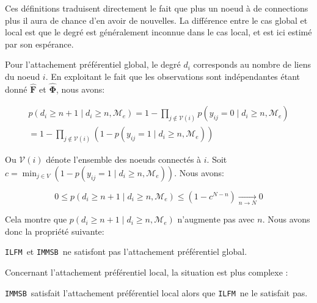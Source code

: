 \documentclass[french]{hermes-journal}
\newcommand{\ilfm}{\texttt{ILFM}}
\newcommand{\immsb}{\texttt{IMMSB}}
\newcommand{\pr}{p}
\newcommand{\mat}[1]{\bm{#1}}
\begin{document}
Ces définitions traduisent directement le fait que plus un noeud à de connections plus il aura de chance d'en avoir de nouvelles. La différence entre le cas global et local est que le degré est généralement inconnue dans le cas local, et est ici estimé par son espérance.

Pour l'attachement préférentiel global, le degré $d_i$ corresponds au nombre de liens du noeud $i$. En exploitant le fait que les observations sont indépendantes étant donné $\mat{\hat{F}}$ et $\mat{\hat{\Phi}}$, nous avons:


\begin{align}
\pr(d_{i} \ge n+1 \mid d_{i} \ge n, \mathcal{M}_e) = 1 - \prod_{j \notin \mathcal{V}(i)} p(y_{ij} = 0 \mid d_{i} \ge n, \mathcal{M}_e) \nonumber \\
= 1 - \prod_{j \notin \mathcal{V}(i)} (1 - p(y_{ij} = 1 \mid d_{i} \ge n, \mathcal{M}_e)) \nonumber
\end{align}

Ou $\mathcal{V}(i)$ dénote l'ensemble des noeuds connectés à $i$. Soit $c=\min_{j \in V}  (1-p(y_{ij} = 1 \mid d_{i} \ge n, \mathcal{M}_e))$. Nous avons:

\[
0 \le \pr(d_{i} \ge n+1 \mid d_{i} \ge n, \mathcal{M}_e) \le (1 - c^{N-n}) \xrightarrow[n \rightarrow N]{} 0
\]

Cela montre que $\pr(d_{i} \ge n+1 \mid d_{i} \ge n, \mathcal{M}_e)$ n'augmente pas avec $n$. Nous avons donc la propriété suivante:

\begin{proposition}[]
\label{pref-attch-glob}
\ilfm\ et \immsb\ ne satisfont pas l'attachement préférentiel global.
\end{proposition}

Concernant l'attachement préférentiel local, la situation est plus complexe :

\begin{proposition}[]
\label{pref-attch-loc}
\immsb\ satisfait l'attachement préférentiel local alors que \ilfm\ ne le satisfait pas.
\end{proposition}
\end{document}
